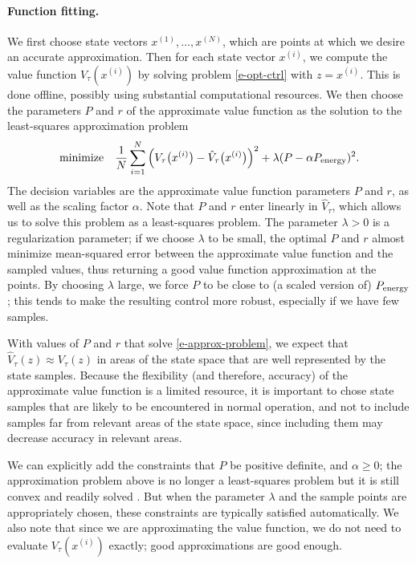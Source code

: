\documentclass[12pt]{article}
\begin{document}
\paragraph{Function fitting.}
\label{s-function-fitting}
We first choose state vectors $x^{(1)}, \dots, x^{(N)}$,
which are points at which we desire an accurate approximation.
Then for each state vector $x^{(i)}$, we compute the value function
$V_\tau(x^{(i)})$ by solving problem \eqref{e-opt-ctrl} with $z = x^{(i)}$.
This is done offline, possibly using substantial computational resources.
We then choose the parameters $P$ and $r$ of the approximate value function
as the solution to the least-squares approximation problem
\begin{equation}
\begin{array}{ll}
\mbox{minimize} & 
  \displaystyle \frac1N
  \sum_{i=1}^N \Big( V_\tau\big(x^{(i)}\big) - \hat V_\tau\big(x^{(i)}\big) \Big)^2
  +
  \lambda(P - \alpha P_{\rm energy})^2.
\end{array}
\label{e-approx-problem}
\end{equation}
The decision variables are the approximate value function parameters
$P$ and $r$, as well as the scaling factor $\alpha$.
Note that $P$ and $r$ enter linearly in $\hat V_\tau$,
which allows us to solve this problem as a least-squares problem.
The parameter $\lambda>0$ is a regularization parameter;
if we choose $\lambda$ to be small,
the optimal $P$ and $r$ almost minimize
mean-squared error between the approximate value function
and the sampled values,
thus returning a good value function approximation at the points.
By choosing $\lambda$ large,
we force $P$ to be close to (a scaled version of) $P_{\rm energy}$;
this tends to make the resulting control more robust,
especially if we have few samples.

With values of $P$ and $r$ that solve \eqref{e-approx-problem},
we expect that $\hat V_\tau(z) \approx V_\tau(z)$ 
in areas of the state space that are well represented by the state samples.
Because the flexibility (and therefore, accuracy)
of the approximate value function is a limited resource,
it is important to chose state samples that are likely
to be encountered in normal operation,
and not to include samples
far from relevant areas of the state space,
since including them may decrease accuracy in relevant areas.

We can explicitly add the constraints that $P$ be positive definite,
and $\alpha \geq 0$; the approximation problem above is no longer
a least-squares problem but it is still convex and readily solved
\cite{boyd2004convex}.
But when the parameter $\lambda$ and the sample points are appropriately
chosen, these constraints are typically satisfied automatically.
We also note that since we are approximating the value function, we 
do not need to evaluate $V_\tau(x^{(i)})$ exactly; good approximations are
good enough.
\end{document}
